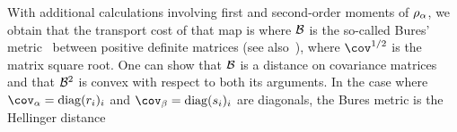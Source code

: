 With additional calculations involving first and second-order moments of $\rho_\alpha$, we obtain that the transport cost of that map is
where $\mathcal{B}$ is the so-called Bures' metric~\cite{bures1969extension} between positive definite matrices (see also~\cite{forrester2016relating}),
where $\cov^{1/2}$ is the matrix square root. One can show that $\mathcal{B}$ is a distance on covariance matrices and that $\mathcal{B}^2$ is convex with respect to both its arguments. 
%
In the case where $\cov_\al = \diag(r_i)_i$ and $\cov_\be = \diag(s_i)_i$ are diagonals, the Bures metric is the Hellinger distance
